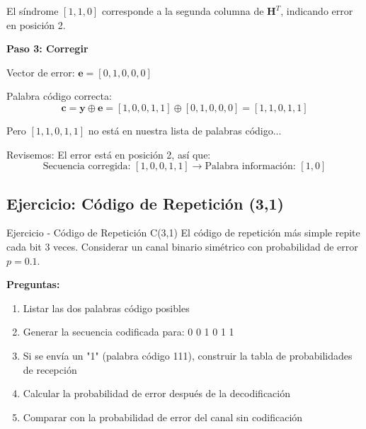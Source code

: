 \documentclass[10pt,a4paper]{article}
\begin{document}
\begin{solucion}
El síndrome $[1, 1, 0]$ corresponde a la segunda columna de $\mathbf{H}^T$, indicando error en posición 2.

\textbf{Paso 3: Corregir}

Vector de error: $\mathbf{e} = [0, 1, 0, 0, 0]$

Palabra código correcta:
\[
\mathbf{c} = \mathbf{y} \oplus \mathbf{e} = [1, 0, 0, 1, 1] \oplus [0, 1, 0, 0, 0] = [1, 1, 0, 1, 1]
\]

Pero $[1, 1, 0, 1, 1]$ no está en nuestra lista de palabras código...

Revisemos: El error está en posición 2, así que:
\[
\boxed{\text{Secuencia corregida: } [1, 0, 0, 1, 1] \rightarrow \text{Palabra información: } [1, 0]}
\]
\end{solucion}

\newpage
\subsection{Ejercicio: Código de Repetición (3,1)}

\begin{ejercicio}{Ejercicio - Código de Repetición C(3,1)}
El código de repetición más simple repite cada bit 3 veces. Considerar un canal binario simétrico con probabilidad de error $p = 0.1$.

\textbf{Preguntas:}
\begin{enumerate}
\item Listar las dos palabras código posibles
\item Generar la secuencia codificada para: 0 0 1 0 1 1
\item Si se envía un "1" (palabra código 111), construir la tabla de probabilidades de recepción
\item Calcular la probabilidad de error después de la decodificación
\item Comparar con la probabilidad de error del canal sin codificación
\end{enumerate}
\end{ejercicio}
\end{document}
